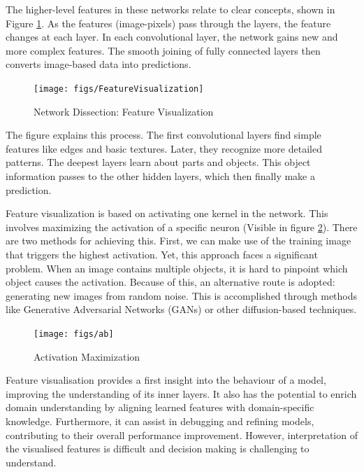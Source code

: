 The higher-level features in these networks relate to clear concepts, shown in Figure \ref{fig:feature-visualization}. As the features (image-pixels) pass through the layers, the feature changes at each layer. In each convolutional layer, the network gains new and more complex features. The smooth joining of fully connected layers then converts image-based data into predictions.
\\
\begin{figure}[H]
	\centering
	\texttt{[image: figs/FeatureVisualization]}
	\caption[Network Dissection: Feature Visualization \cite{olah2017feature}]{Network Dissection: Feature Visualization }
	\label{fig:feature-visualization}
\end{figure}

The figure explains this process. The first convolutional layers find simple features like edges and basic textures. Later, they recognize more detailed patterns. The deepest layers learn about parts and objects. This object information passes to the other hidden layers, which then finally make a prediction.

Feature visualization is based on activating one kernel in the network. This involves maximizing the activation of a specific neuron (Visible in figure \ref*{fig:optimization}). There are two methods for achieving this. First, we can make use of the training image that triggers the highest activation. Yet, this approach faces a significant problem. When an image contains multiple objects, it is hard to pinpoint which object causes the activation. Because of this, an alternative route is adopted: generating new images from random noise. This is accomplished through methods like Generative Adversarial Networks (GANs) or other diffusion-based techniques.

\begin{figure}[H]
	\centering
	\texttt{[image: figs/ab]}
	\caption[Activation Maximization\cite{olah2017feature}]{Activation Maximization}
	\label{fig:optimization}
\end{figure}

Feature visualisation provides a first insight into the behaviour of a model, improving the understanding of its inner layers. It also has the potential to enrich domain understanding by aligning learned features with domain-specific knowledge. Furthermore, it can assist in debugging and refining models, contributing to their overall performance improvement. However, interpretation of the visualised features is difficult and decision making is challenging to understand.

